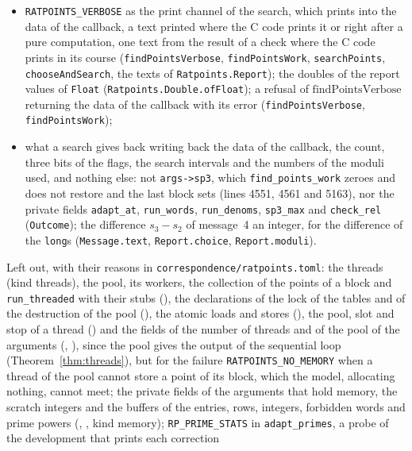 \begin{itemize}
    of \verb|-t| checked and then ignored (\verb|checkOptions|);
  \item \verb|RATPOINTS_VERBOSE| as the print channel of the search, which prints into the data of
    the callback, a text printed where the C code prints it or right after a pure computation, one
    text from the result of a check where the C code prints in its course (\verb|findPointsVerbose|,
    \verb|findPointsWork|, \verb|searchPoints|, \verb|chooseAndSearch|, the texts of
    \verb|Ratpoints.Report|); the doubles of the report values of \verb|Float|
    (\verb|Ratpoints.Double.ofFloat|); a refusal of $\mathrm{findPointsVerbose}$ returning the data
    of the callback with its error (\verb|findPointsVerbose|, \verb|findPointsWork|);
  \item what a search gives back writing back the data of the callback, the count, three bits of the
    flags, the search intervals and the numbers of the moduli used, and nothing else: not
    \verb|args->sp3|, which \verb|find_points_work| zeroes and does not restore and the last block
    sets (lines 4551, 4561 and 5163), nor the private fields \verb|adapt_at|, \verb|run_words|,
    \verb|run_denoms|, \verb|sp3_max| and \verb|check_rel| (\verb|Outcome|); the difference
    $s_3 - s_2$ of message~4 an integer, for the difference of the \verb|long|s
    (\verb|Message.text|, \verb|Report.choice|, \verb|Report.moduli|).
\end{itemize}
Left out, with their reasons in \verb|correspondence/ratpoints.toml|: the threads (kind threads),
the pool, its workers, the collection of the points of a block and \verb|run_threaded| with their
stubs (), the declarations of the lock of the tables and of the
destruction of the pool (), the atomic loads and stores
(), the pool, slot and stop of a thread
() and the fields of the number of threads and of the pool of the
arguments (, ), since the pool gives
the output of the sequential loop (Theorem~\ref{thm:threads}), but for the failure
\verb|RATPOINTS_NO_MEMORY| when a thread of the pool cannot store a point of its block, which the
model, allocating nothing, cannot meet; the private fields of the arguments that hold memory, the
scratch integers and the buffers of the entries, rows, integers, forbidden words and prime powers
(, , kind memory);
\verb|RP_PRIME_STATS| in \verb|adapt_primes|, a probe of the development that prints each correction
